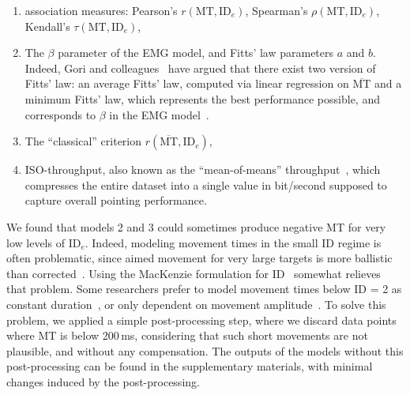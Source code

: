 \documentclass[acmlarge, manuscript,review]{acmart}
\newcommand{\mmt}{\ensuremath{\overline{\mt}}\xspace}
\newcommand{\mt}{\ensuremath{{\text{MT}}}\xspace}
\newcommand{\ide}{\ensuremath{{\text{ID}_e}}\xspace}
\begin{document}
\begin{enumerate}
	\item association measures: Pearson's $r(\mt, \ide)$, Spearman's $\rho(\mt, \ide)$, Kendall's $\tau(\mt, \ide)$,
	\item The $\beta$ parameter of the EMG model, and Fitts' law parameters $a$ and $b$. Indeed, Gori and colleagues~\cite{gori2017,gori2018tochi} have argued that there exist two version of Fitts' law: an average Fitts' law, computed via linear regression on \mmt and a minimum Fitts' law, which represents the best performance possible, and corresponds to $\beta$ in the EMG model~\cite{gori2019}.
	\item The ``classical'' criterion $r(\overline{\mt}, \ide)$,
	\item ISO-throughput, also known as the ``mean-of-means'' throughput~\cite{soukoreff2004}, which compresses the entire dataset into a single value in bit/second supposed to capture overall pointing performance.
\end{enumerate}

We found that models 2 and 3 could sometimes produce negative MT for very low levels of \ide. Indeed, modeling movement times in the small ID regime is often problematic, since aimed movement for very large targets is more ballistic than corrected~\cite{elliott2017,gori2020}. Using the MacKenzie formulation for ID~\cite{gori2018chi} somewhat relieves that problem. Some researchers prefer to model movement times below ID = 2 as constant duration~\cite{crossman1957}, or only dependent on movement amplitude~\cite{gan1988}. 
To solve this problem, we applied a simple post-processing step, where we  discard data points where MT is below 200\,ms, considering that such short movements are not plausible, and without any compensation. The outputs of the models without this post-processing can be found in the supplementary materials, with minimal changes induced by the post-processing.
\end{document}
